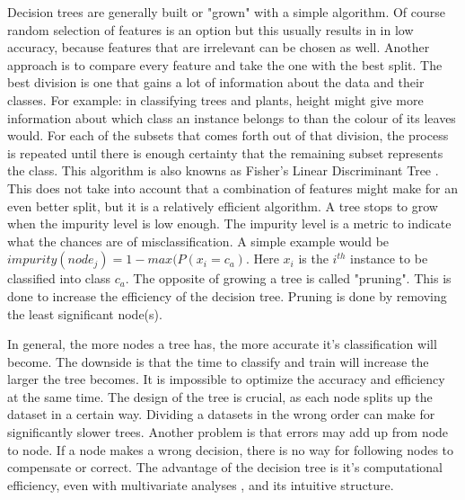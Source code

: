 Decision trees are generally built or "grown" with a simple algorithm. Of course random selection of features is an option but this usually results in in low accuracy, because features that are irrelevant can be chosen as well. Another approach is to compare every feature and take the one with the best split. The best division is one that gains a lot of information about the data and their classes. For example: in classifying trees and plants, height might give more information about which class an instance belongs to than the colour of its leaves would. For each of the subsets that comes forth out of that division, the process is repeated until there is enough certainty that the remaining subset represents the class. This algorithm is also knowns as Fisher's Linear Discriminant Tree \cite{LópezChau20136283}. This does not take into account that a combination of features might make for an even better split, but it is a relatively efficient algorithm. A tree stops to grow when the impurity level is low enough. The impurity level is a metric to indicate what the chances are of misclassification. A simple example would be $impurity(node_j) = 1 - max(P(x_i = c_a) $. Here $x_i$ is the $i^{th}$ instance to be classified into class $c_a$. The opposite of growing a tree is called "pruning". This is done to increase the efficiency of the decision tree. Pruning is done by removing the least significant node(s).

In general, the more nodes a tree has, the more accurate it's classification will become. The downside is that the time to classify and train will increase the larger the tree becomes. It is impossible to optimize the accuracy and efficiency at the same time. The design of the tree is crucial, as each node splits up the dataset in a certain way. Dividing a datasets in the wrong order can make for significantly slower trees. Another problem is that errors may add up from node to node. If a node makes a wrong decision, there is no way for following nodes to compensate or correct. The advantage of the decision tree is it's computational efficiency, even with multivariate analyses \cite{safavian1991survey}, and its intuitive structure.